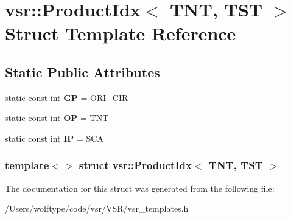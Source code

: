 \hypertarget{structvsr_1_1_product_idx_3_01_t_n_t_00_01_t_s_t_01_4}{\section{vsr\-:\-:Product\-Idx$<$ T\-N\-T, T\-S\-T $>$ Struct Template Reference}
\label{structvsr_1_1_product_idx_3_01_t_n_t_00_01_t_s_t_01_4}
}
\subsection*{Static Public Attributes}
\begin{DoxyCompactItemize}
\item 
\hypertarget{structvsr_1_1_product_idx_3_01_t_n_t_00_01_t_s_t_01_4_af250dbadc55d2e176fc3d4d9f37a83d1}{static const int {\bfseries G\-P} = O\-R\-I\-\_\-\-C\-I\-R}\label{structvsr_1_1_product_idx_3_01_t_n_t_00_01_t_s_t_01_4_af250dbadc55d2e176fc3d4d9f37a83d1}

\item 
\hypertarget{structvsr_1_1_product_idx_3_01_t_n_t_00_01_t_s_t_01_4_aaa8a7736ee2b41b1612d5af9a0e4c9f4}{static const int {\bfseries O\-P} = T\-N\-T}\label{structvsr_1_1_product_idx_3_01_t_n_t_00_01_t_s_t_01_4_aaa8a7736ee2b41b1612d5af9a0e4c9f4}

\item 
\hypertarget{structvsr_1_1_product_idx_3_01_t_n_t_00_01_t_s_t_01_4_a8e197680ef5eaff3a33db0a789d9969a}{static const int {\bfseries I\-P} = S\-C\-A}\label{structvsr_1_1_product_idx_3_01_t_n_t_00_01_t_s_t_01_4_a8e197680ef5eaff3a33db0a789d9969a}

\end{DoxyCompactItemize}
\subsubsection*{template$<$$>$ struct vsr\-::\-Product\-Idx$<$ T\-N\-T, T\-S\-T $>$}



The documentation for this struct was generated from the following file\-:\begin{DoxyCompactItemize}
\item 
/\-Users/wolftype/code/vsr/\-V\-S\-R/vsr\-\_\-templates.\-h\end{DoxyCompactItemize}
